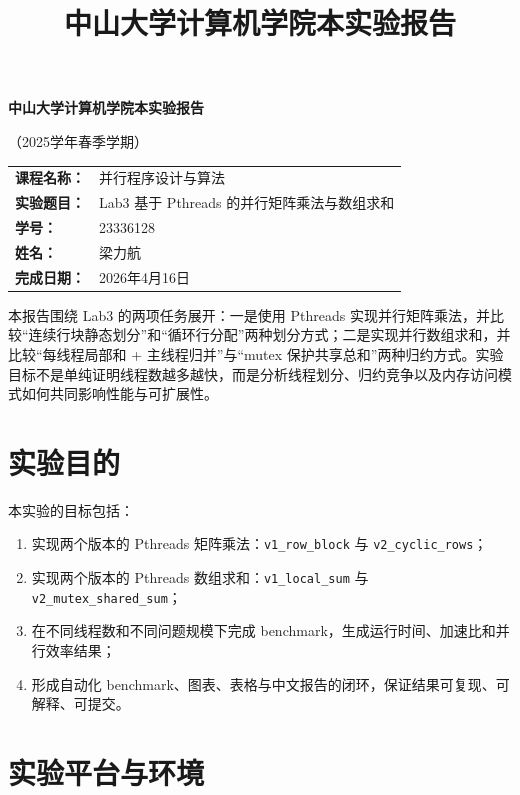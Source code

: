\documentclass[UTF8,a4paper,12pt,fontset=none]{ctexart}
\title{\bfseries 中山大学计算机学院本实验报告}
\author{}
\date{}
\begin{document}
\begin{titlepage}
  \centering
  {\bfseries 中山大学计算机学院本实验报告\par}
  \vspace{0.5em}
  {（2025学年春季学期）\par}
  \vspace{2em}

  \begin{tabularx}{0.9\textwidth}{>{\bfseries}p{4cm}X}
    课程名称： & 并行程序设计与算法 \\
    实验题目： & Lab3 基于 Pthreads 的并行矩阵乘法与数组求和 \\
    学号： & 23336128 \\
    姓名： & 梁力航 \\
    完成日期： & 2026年4月16日 \\
  \end{tabularx}

  \vfill
  \begin{minipage}{0.88\textwidth}
    \small
    本报告围绕 Lab3 的两项任务展开：一是使用 Pthreads 实现并行矩阵乘法，并比较“连续行块静态划分”和“循环行分配”两种划分方式；二是实现并行数组求和，并比较“每线程局部和 + 主线程归并”与“mutex 保护共享总和”两种归约方式。实验目标不是单纯证明线程数越多越快，而是分析线程划分、归约竞争以及内存访问模式如何共同影响性能与可扩展性。
  \end{minipage}
\end{titlepage}

\section{实验目的}

本实验的目标包括：
\begin{enumerate}[leftmargin=2.2em]
  \item 实现两个版本的 Pthreads 矩阵乘法：\texttt{v1\_row\_block} 与 \texttt{v2\_cyclic\_rows}；
  \item 实现两个版本的 Pthreads 数组求和：\texttt{v1\_local\_sum} 与 \texttt{v2\_mutex\_shared\_sum}；
  \item 在不同线程数和不同问题规模下完成 benchmark，生成运行时间、加速比和并行效率结果；
  \item 形成自动化 benchmark、图表、表格与中文报告的闭环，保证结果可复现、可解释、可提交。
\end{enumerate}

\section{实验平台与环境}
\end{document}
